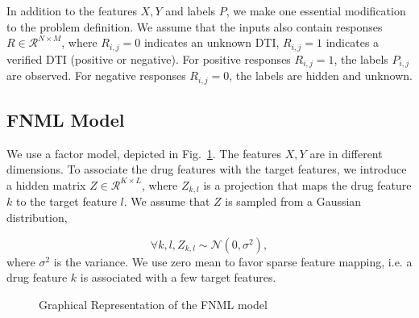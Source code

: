 \documentclass[conference]{IEEEtran}
\begin{document}
In addition to the features $X,Y$ and labels $P$, we make one essential modification to the problem definition. We assume that the inputs also contain responses $R\in \mathcal{R}^{N\times M}$, where $R_{i,j}=0$ indicates an unknown DTI, $R_{i,j}=1$ indicates a verified DTI (positive or negative). For positive responses $R_{i,j}=1$, the labels $P_{i,j}$ are observed. For negative responses $R_{i,j}=0$, the labels are hidden and unknown.

\subsection{FNML Model}\label{sec:model}

We use a factor model, depicted in Fig.~\ref{fig:model}. The features $X,Y$ are in different dimensions. To associate the drug features with the target features, we introduce a hidden matrix $Z\in\mathcal{R}^{K\times L}$, where $Z_{k,l}$ is a projection that maps the drug feature $k$ to the target feature $l$. We assume that $Z$ is sampled from a Gaussian distribution,

\begin{equation}\label{equ:z}
\forall k,l, Z_{k,l}\sim \mathcal{N}(0,\sigma^2),
\end{equation}
where $\sigma^2$ is the variance. We use zero mean to favor sparse feature mapping, i.e. a drug feature $k$ is associated with a few target features.

\begin{figure}
  \centering
{}
\vspace*{-5pt}
\caption{Graphical Representation of the FNML model}\label{fig:model}
\end{figure}
\end{document}
